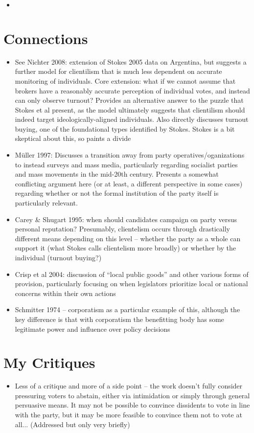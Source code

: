 \documentclass[12pt]{article}
\begin{document}
\begin{itemize}[leftmargin=*, itemsep=4pt]
    \item
\end{itemize}


\section{Connections}

\begin{itemize}
    \item See Nichter 2008: extension of Stokes 2005 data on Argentina, but suggests a further model for clientilism that is much less dependent on accurate monitoring of individuals. Core extension: what if we cannot assume that brokers have a reasonably accurate perception of individual votes, and instead can only observe turnout? Provides an alternative answer to the puzzle that Stokes et al present, as the model ultimately suggests that clientilism should indeed target ideologically-aligned individuals. Also directly discusses turnout buying, one of the foundational types identified by Stokes. Stokes is a bit skeptical about this, so paints a divide
    \item Müller 1997: Discusses a transition away from party operatives/oganizations to instead surveys and mass media, particularly regarding socialist parties and mass movements in the mid-20th century. Presents a somewhat conflicting argument here (or at least, a different perspective in some cases) regarding whether or not the formal institution of the party itself is particularly relevant.
    \item Carey \& Shugart 1995: when should candidates campaign on party versus personal reputation? Presumably, clientelism occurs through drastically different means depending on this level -- whether the party as a whole can support it (what Stokes calls clientelism more broadly) or whether by the individual (turnout buying?)
    \item Crisp et al 2004: discussion of ``local public goods'' and other various forms of provision, particularly focusing on when legislators prioritize local or national concerns within their own actions
    \item Schmitter 1974 -- corporatism as a particular example of this, although the key difference is that with corporatism the benefitting body has some legitimate power and influence over policy decisions
\end{itemize}


\section{My Critiques}

\begin{itemize}
    \item Less of a critique and more of a side point -- the work doesn't fully consider pressuring voters to abstain, either via intimidation or simply through general persuasive means. It may not be possible to convince dissidents to vote in line with the party, but it may be more feasible to convince them not to vote at all... (Addressed but only very briefly)
\end{itemize}
\end{document}
